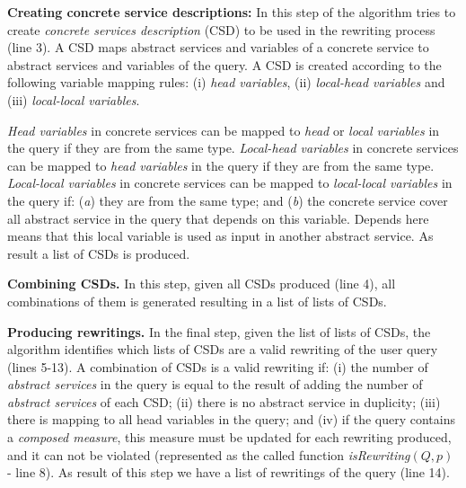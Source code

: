 \noindent \textbf{Creating concrete service descriptions:} In this step of the
 algorithm tries to create \textit{concrete services description} (CSD) to be
 used in the rewriting process (line 3). A CSD maps abstract services and
 variables of a concrete service to abstract services and variables of the
 query. A CSD is created according to the following variable mapping rules:  (i)
 \textit{head variables}, (ii) \textit{local-head variables} and  (iii)
 \textit{local-local variables}.
 
  \textit{Head variables} in concrete services can be mapped to
  \textit{head} or \textit{local variables} in the query if they are from the
  same type. \textit{Local-head variables} in concrete services can be mapped to
  \textit{head variables} in the query if they are from the same type.
  \textit{Local-local variables} in concrete services can be mapped to
  \textit{local-local variables} in the query if: (\textit{a}) they are from the
  same type; and (\textit{b}) the concrete service cover all abstract service in
  the query that depends on this variable. Depends here means that this local
  variable is used as input in another abstract service. As result a list of
  CSDs is produced.

 
\noindent \textbf{Combining CSDs.} In this step, given all CSDs produced (line
4), all combinations of them is generated resulting in a list of lists of CSDs.

\noindent \textbf{Producing rewritings.} In the final step, given the list of
 lists of CSDs, the algorithm identifies which lists of CSDs are a valid
 rewriting of the user query (lines 5-13).
A combination of CSDs is a valid rewriting if: (i) the number of
 \textit{abstract services} in the query is equal to the result of adding the
 number of \textit{abstract services} of each CSD; (ii) there is no abstract
 service in duplicity; (iii) there is mapping to all head variables in the
 query; and (iv) if the query contains a \textit{composed measure}, this measure
 must be updated for each rewriting produced, and it can not be violated
 (represented as the called function \textit{isRewriting}$(Q, p)$ - line 8).
 As result of this step we have a list of rewritings of the query (line 14).

